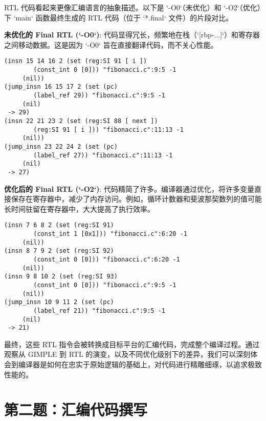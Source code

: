 \documentclass[a4paper]{article}
\begin{document}
RTL 代码看起来更像汇编语言的抽象描述。以下是 `-O0`（未优化）和 `-O2`（优化）下 `main` 函数最终生成的 RTL 代码（位于 `*.final` 文件）的片段对比。

\textbf{未优化的 Final RTL (`-O0`)}:
代码显得冗长，频繁地在栈（`[rbp-...]`）和寄存器之间移动数据。这是因为 `-O0` 旨在直接翻译代码，而不关心性能。
\begin{lstlisting}[language=text, caption={fibonacci.c.273r.final (未优化片段)}]
(insn 15 14 16 2 (set (reg:SI 91 [ i ])
        (const_int 0 [0])) "fibonacci.c":9:5 -1
     (nil))
(jump_insn 16 15 17 2 (set (pc)
        (label_ref 29)) "fibonacci.c":9:5 -1
     (nil)
 -> 29)
(insn 22 21 23 2 (set (reg:SI 88 [ next ])
        (reg:SI 91 [ i ])) "fibonacci.c":11:13 -1
     (nil))
(jump_insn 23 22 24 2 (set (pc)
        (label_ref 27)) "fibonacci.c":11:13 -1
     (nil)
 -> 27)
\end{lstlisting}

\textbf{优化后的 Final RTL (`-O2`)}:
代码精简了许多。编译器通过优化，将许多变量直接保存在寄存器中，减少了内存访问。例如，循环计数器和斐波那契数列的值可能长时间驻留在寄存器中，大大提高了执行效率。
\begin{lstlisting}[language=text, caption={fibonacci.c.340r.final (优化片段)}]
(insn 7 6 8 2 (set (reg:SI 91)
        (const_int 1 [0x1])) "fibonacci.c":6:20 -1
     (nil))
(insn 8 7 9 2 (set (reg:SI 92)
        (const_int 0 [0])) "fibonacci.c":6:20 -1
     (nil))
(insn 9 8 10 2 (set (reg:SI 93)
        (const_int 0 [0])) "fibonacci.c":9:5 -1
     (nil))
(jump_insn 10 9 11 2 (set (pc)
        (label_ref 21)) "fibonacci.c":9:5 -1
     (nil)
 -> 21)
\end{lstlisting}

最终，这些 RTL 指令会被转换成目标平台的汇编代码，完成整个编译过程。通过观察从 GIMPLE 到 RTL 的演变，以及不同优化级别下的差异，我们可以深刻体会到编译器是如何在忠实于原始逻辑的基础上，对代码进行精雕细琢，以追求极致性能的。
\section{第二题：汇编代码撰写}
\end{document}
